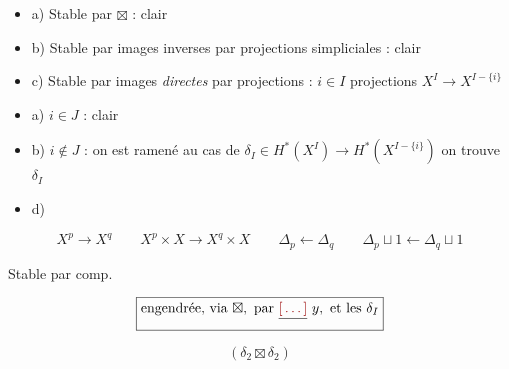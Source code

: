 \documentclass[11pt,a4paper]{article}
\begin{document}
\begin{itemize}
  \item a) Stable par $\boxtimes$ : clair
  \item b) Stable par images inverses par projections simpliciales : clair
  \item c) Stable par images \emph{directes} par projections :
  $i \in I$   projections $X^{I} \to X^{I - \{i\}}$
  \item \quad a) $i \in J$ : clair
  \item \quad b) $i \notin J$ : on est ramené au cas de
  $\delta_{I} \in H^{*}(X^{I}) \to H^{*}(X^{I - \{i\}})$
  \struck{\ill{}} on trouve $\delta_{I}$
  \item d) \struck{\ill{}}
\end{itemize}

\[
  X^{p} \to X^{q} \qquad X^{p} \times X \to X^{q} \times X \qquad
  \Delta_{p} \leftarrow \Delta_{q} \qquad
  \Delta_{p} \sqcup 1 \leftarrow \Delta_{q} \sqcup 1
\]

Stable par comp.

\[
  \boxed{\text{engendrée, via } \boxtimes, \text{ par } \struck{\ill{}}\ y, \text{ et les } \delta_{I}}
\]

\[
  (\delta_{2} \boxtimes \delta_{2})
\]
\end{document}
